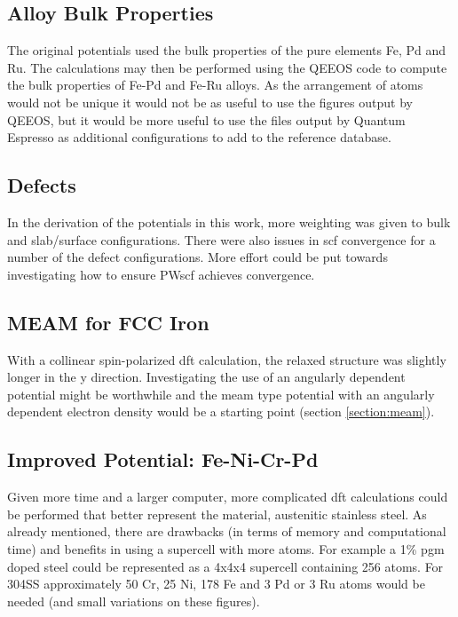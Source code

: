 \subsection{Alloy Bulk Properties}

The original potentials used the bulk properties of the pure elements Fe, Pd and Ru.  The calculations may then be performed using the QEEOS code to compute the bulk properties of Fe-Pd and Fe-Ru alloys.  As the arrangement of atoms would not be unique it would not be as useful to use the figures output by QEEOS, but it would be more useful to use the files output by Quantum Espresso as additional configurations to add to the reference database. 


\subsection{Defects}

In the derivation of the potentials in this work, more weighting was given to bulk and slab/surface configurations.  There were also issues in \acrshort{scf} convergence for a number of the defect configurations.  More effort could be put towards investigating how to ensure PWscf achieves convergence. 


\subsection{MEAM for FCC Iron}
\label{section:futuremeam}

With a collinear spin-polarized \acrshort{dft} calculation, the relaxed structure was slightly longer in the y direction.  Investigating the use of an angularly dependent potential might be worthwhile and the \acrshort{meam} type potential with an angularly dependent electron density would be a starting point (section \ref{section:meam}). 
 

\subsection{Improved Potential: Fe-Ni-Cr-Pd}

Given more time and a larger computer, more complicated \acrshort{dft} calculations could be performed that better represent the material, austenitic stainless steel.  As already mentioned, there are drawbacks (in terms of memory and computational time) and benefits in using a supercell with more atoms.  For example a 1\% \acrshort{pgm} doped steel could be represented as a 4x4x4 supercell containing 256 atoms.  For \gls{304SS} approximately 50 Cr, 25 Ni, 178 Fe and 3 Pd or 3 Ru atoms would be needed (and small variations on these figures).

